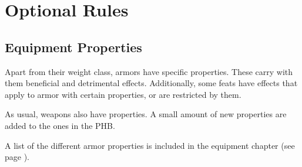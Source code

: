 \section{Optional Rules} \label{sec::optionalrules}
\subsection*{Equipment Properties} \label{ssec::equipmentproperties1}
    Apart from their weight class, armors have specific properties.
    These carry with them beneficial and detrimental effects.
    Additionally, some feats have effects that apply to armor with certain properties, or are restricted by them.

    As usual, weapons also have properties.
    A small amount of new properties are added to the ones in the PHB.

    A list of the different armor properties is included in the equipment chapter (see page \pageref{ssec::armorproperties}).





\pagebreak~

